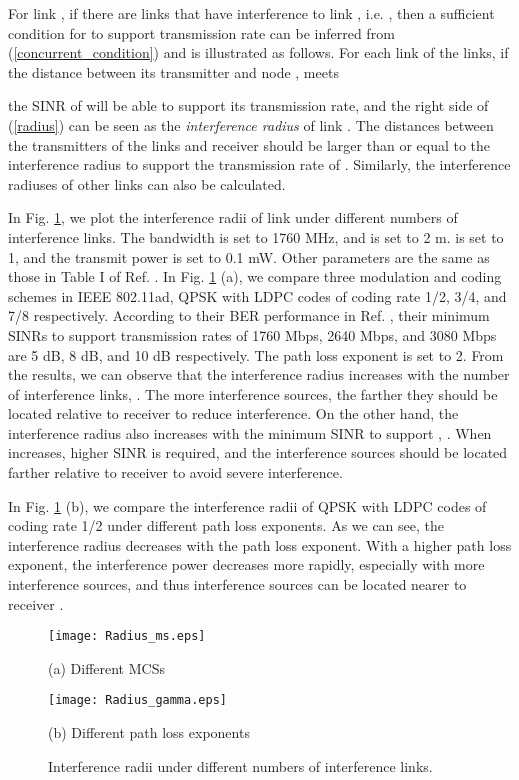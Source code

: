 \documentclass[journal]{IEEEtran}
\begin{document}
For link , if there are  links that have interference to link
, i.e. , then a
sufficient condition for  to support transmission rate  can be
inferred from (\ref{concurrent_condition}) and is illustrated as follows. For each link
 of the  links, if the distance between its transmitter  and
node ,  meets


the SINR of  will be able to support its transmission rate, and the right side of
(\ref{radius}) can be seen as the \emph{interference radius} of link . The distances
between the transmitters of the  links and receiver  should be larger than
or equal to the interference radius to support the transmission rate of . Similarly,
the interference radiuses of other links can also be calculated.

In Fig. \ref{fig:infer_radii}, we plot the interference radii of link  under
different numbers of interference links. The bandwidth  is set to 1760 MHz, and 
is set to 2 m.  is set to 1, and the transmit power  is set to 0.1 mW. Other parameters
are the same as those in Table I of Ref. \cite{Qiao}. In Fig. \ref{fig:infer_radii} (a), we compare
three modulation and coding schemes in IEEE 802.11ad, QPSK with LDPC codes of coding rate 1/2, 3/4,
and 7/8 respectively. According to their BER performance in Ref. \cite{mcs}, their minimum SINRs to
support transmission rates of 1760 Mbps, 2640 Mbps, and 3080 Mbps are 5 dB, 8 dB, and 10 dB
respectively. The path loss exponent is set to 2. From the results, we can observe that the
interference radius increases with the number of interference links, . The more
interference sources, the farther they should be located relative to receiver  to reduce
interference. On the other hand, the interference radius also increases with the minimum SINR to
support , . When  increases, higher SINR
is required, and the interference sources should be located farther relative to receiver  to
avoid severe interference.

In Fig. \ref{fig:infer_radii} (b), we compare the interference radii of QPSK with LDPC codes of
coding rate 1/2 under different path loss exponents. As we can see, the interference radius
decreases with the path loss exponent. With a higher path loss exponent, the interference power
decreases more rapidly, especially with more interference sources, and thus interference sources
can be located nearer to receiver .






\begin{figure}[htbp]
\begin{minipage}[t]{0.5\linewidth}
\centering
\texttt{[image: Radius\_ms.eps]}
\centerline{\small (a) Different MCSs}
\end{minipage}\begin{minipage}[t]{0.5\linewidth}
\centering
\texttt{[image: Radius\_gamma.eps]}
\centerline{\small (b) Different path loss exponents}
\end{minipage}\caption{Interference radii under different numbers of interference links.}
\label{fig:infer_radii} \vspace*{-3mm}
\end{figure}
\end{document}
